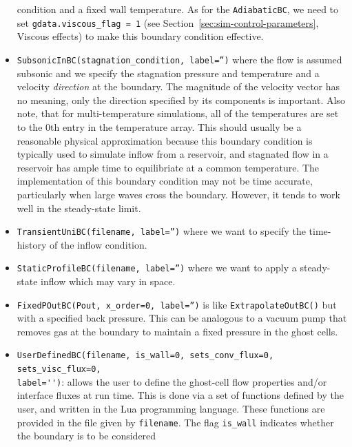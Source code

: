 \begin{itemize}
      condition and a fixed wall temperature.
      As for the \texttt{AdiabaticBC}, we need to set \verb!gdata.viscous_flag = 1! (see Section~\ref{sec:sim-control-parameters}, Viscous effects) 
      to make this boundary condition effective.
    \item \texttt{SubsonicInBC(stagnation\_condition, label='')} where the flow is assumed subsonic and
      we specify the stagnation pressure and temperature and a velocity \emph{direction} at the boundary. The magnitude of the velocity vector has
      no meaning, only the direction specified by its components is important. Also note, that for multi-temperature simulations, all of the temperatures
      are set to the 0th entry in the temperature array. This should usually be a reasonable physical approximation because this boundary condition
      is typically used to simulate inflow from a reservoir, and stagnated flow in a reservoir has ample time to equilibriate at a common temperature.
      The implementation of this boundary condition may not be time accurate, particularly when large waves cross the boundary. However, it
      tends to work well in the steady-state limit.
    \item \texttt{TransientUniBC(filename, label='')} where we want to specify the time-history of
      the inflow condition.
    \item \texttt{StaticProfileBC(filename, label='')} where we want to apply a steady-state inflow
       which may vary in space.
    \item \texttt{FixedPOutBC(Pout, x\_order=0, label='')} 
      is like \texttt{ExtrapolateOutBC()} but with a specified back pressure.
      This can be analogous to a vacuum pump that removes gas at the boundary to maintain
      a fixed pressure in the ghost cells.
    \item \verb!UserDefinedBC(filename, is_wall=0, sets_conv_flux=0, sets_visc_flux=0,!\\
          \verb!label='')!: 
       allows the user to define the ghost-cell flow properties and/or interface fluxes at run time.
       This is done via a set of functions defined by the user, and written in the Lua
       programming language.
       These functions are provided in the file given by \texttt{filename}.
       The flag \verb!is_wall! indicates whether the boundary is to be considered

\end{itemize}
